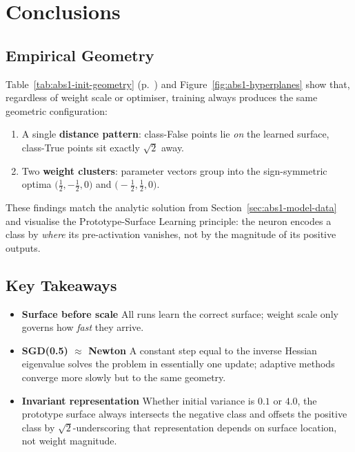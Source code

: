 ﻿%
\section{Conclusions}
\label{sec:abs1-conclusions}

\subsection*{Empirical Geometry}

Table~\ref{tab:abs1-init-geometry} (p.~\pageref{tab:abs1-init-geometry}) and
Figure~\ref{fig:abs1-hyperplanes} show that, regardless of weight scale or
optimiser, training always produces the same geometric configuration:

\begin{enumerate}[label=(\alph*)]
    \item A single \textbf{distance pattern}: class-False points lie \emph{on}
          the learned surface, class-True points sit exactly
          $\sqrt2$ away.
    \item Two \textbf{weight clusters}: parameter vectors group into the
          sign-symmetric optima
          \(\bigl(\tfrac12,-\tfrac12,0\bigr)\) and
          \(\bigl(-\tfrac12,\tfrac12,0\bigr)\).
\end{enumerate}

These findings match the analytic solution from
Section~\ref{sec:abs1-model-data} and visualise the Prototype-Surface Learning
principle: the neuron encodes a class by \emph{where} its pre-activation
vanishes, not by the magnitude of its positive outputs.

\subsection*{Key Takeaways}

\begin{itemize}
    \item \textbf{Surface before scale}  
          All runs learn the correct surface; weight scale only governs how
          \emph{fast} they arrive.
    \item \textbf{SGD(0.5) $\boldsymbol{\approx}$ Newton}  
          A constant step equal to the inverse Hessian eigenvalue solves the
          problem in essentially one update; adaptive methods converge more
          slowly but to the same geometry.
    \item \textbf{Invariant representation}  
          Whether initial variance is $0.1$ or $4.0$, the prototype surface
          always intersects the negative class and offsets the positive class
          by $\sqrt2$-underscoring that representation depends on surface
          location, not weight magnitude.
\end{itemize}

